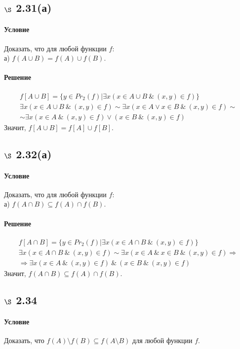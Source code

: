 \documentclass[a4paper,12pt]{article}
\begin{document}
\subsection*{$\S$ 2.31(а)}
\paragraph*{Условие}
Доказать, что для любой функции $f$: \\
а) $f(A\cup B) = f(A)\cup f(B)$.
\paragraph*{Решение}
\begin{gather*}
f[A\cup B] = \{y\in Pr_2(f)|\exists x(x\in A\cup B \ \& \ (x,y)\in f)\} \\
\exists x(x\in A\cup B\ \& \ (x,y)\in f) \sim \exists x(x\in A \vee x\in B \ \& \ (x,y)\in f)  \sim \\
\sim \exists x(x\in A \ \& \ (x,y)\in f) \vee (x\in B \ \& \ (x,y)\in f)
\end{gather*}
Значит, $f[A\cup B] = f[A] \cup f[B]$.

\subsection*{$\S$ 2.32(а)}
\paragraph*{Условие}
Доказать, что для любой функции $f$: \\
а) $f(A\cap B) \subseteq f(A) \cap f(B)$.
\paragraph*{Решение}
\begin{gather*}
f[A\cap B] = \{y\in Pr_2(f)|\exists x (x\in A\cap B \ \& \ (x,y)\in f)\} \\
\exists x(x\in A\cap B \ \& \ (x,y)\in f) \sim \exists x(x\in A \ \& \ x\in B \ \& \ (x,y)\in f) \Rightarrow \\
\Rightarrow \exists x(x\in A \ \&\ (x,y)\in f) \ \& \ (x\in B \ \& \ (x,y)\in f)
\end{gather*}
Значит, $f(A\cap B) \subseteq f(A) \cap f(B)$.

\subsection*{$\S$ 2.34}
\paragraph*{Условие}
Доказать, что $f(A)\setminus f(B) \subseteq f(A\setminus B)$ для любой функции $f$. 
\end{document}
